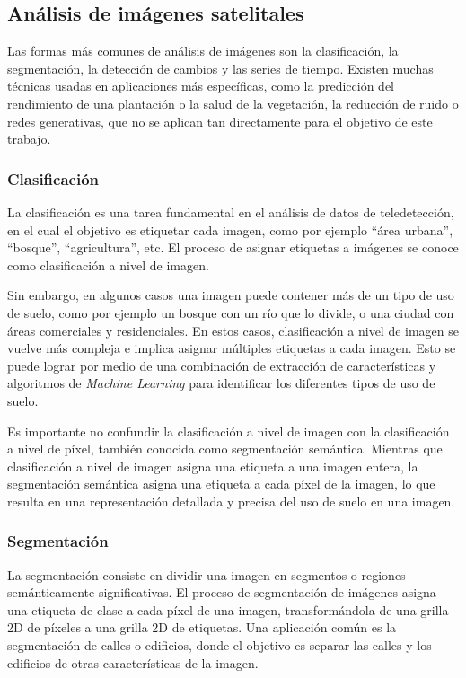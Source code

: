 \subsection{Análisis de imágenes satelitales}

Las formas más comunes de análisis de imágenes son la clasificación, la segmentación, la detección de cambios y las series de tiempo. Existen muchas técnicas usadas en aplicaciones más específicas, como la predicción del rendimiento de una plantación o la salud de la vegetación, la reducción de ruido o redes generativas, que no se aplican tan directamente para el objetivo de este trabajo.

\subsubsection{Clasificación}

La clasificación es una tarea fundamental en el análisis de datos de teledetección, en el cual el objetivo es etiquetar cada imagen, como por ejemplo \enquote{área urbana}, \enquote{bosque}, \enquote{agricultura}, etc. El proceso de asignar etiquetas a imágenes se conoce como clasificación a nivel de imagen. \autocite{repo-satellite-image-dl}

Sin embargo, en algunos casos una imagen puede contener más de un tipo de uso de suelo, como por ejemplo un bosque con un río que lo divide, o una ciudad con áreas comerciales y residenciales. En estos casos, clasificación a nivel de imagen se vuelve más compleja e implica asignar múltiples etiquetas a cada imagen. Esto se puede lograr por medio de una combinación de extracción de características y algoritmos de {\it Machine Learning} para identificar los diferentes tipos de uso de suelo. \autocite{repo-satellite-image-dl}

Es importante no confundir la clasificación a nivel de imagen con la clasificación a nivel de píxel, también conocida como segmentación semántica. Mientras que clasificación a nivel de imagen asigna una etiqueta a una imagen entera, la segmentación semántica asigna una etiqueta a cada píxel de la imagen, lo que resulta en una representación detallada y precisa del uso de suelo en una imagen. \autocite{cole-segmentation}

\subsubsection{Segmentación}

La segmentación consiste en dividir una imagen en segmentos o regiones semánticamente significativas. El proceso de segmentación de imágenes asigna una etiqueta de clase a cada píxel de una imagen, transformándola de una grilla 2D de píxeles a una grilla 2D de etiquetas. Una aplicación común es la segmentación de calles o edificios, donde el objetivo es separar las calles y los edificios de otras características de la imagen. \autocite{repo-satellite-image-dl}

